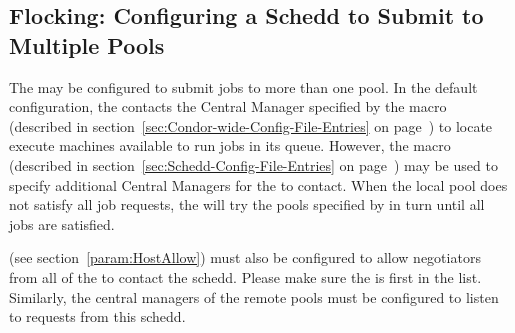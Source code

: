 \subsection{\label{sec:Flocking}
Flocking: Configuring a Schedd to Submit to Multiple Pools}

The  may be configured to submit jobs to more than one
pool.
In the default configuration, the  contacts the
Central Manager specified by the  macro (described
in section~\ref{sec:Condor-wide-Config-File-Entries} on
page~\pageref{sec:Condor-wide-Config-File-Entries})
to locate execute machines
available to run jobs in its queue.
However, the
 macro (described in
section~\ref{sec:Schedd-Config-File-Entries} on
page~\pageref{sec:Schedd-Config-File-Entries}) may 
be used to specify additional 
Central Managers for the  to contact.
When the local
pool does not satisfy all job requests, the  will try
the pools specified by  in turn until all jobs are
satisfied.

 (see
section~\ref{param:HostAllow}) must also be configured to allow
negotiators from all of the  to contact the schedd.
Please make sure the  is first in the 
 list.
Similarly, the central managers of the remote pools must be configured
to listen to requests from this schedd.
